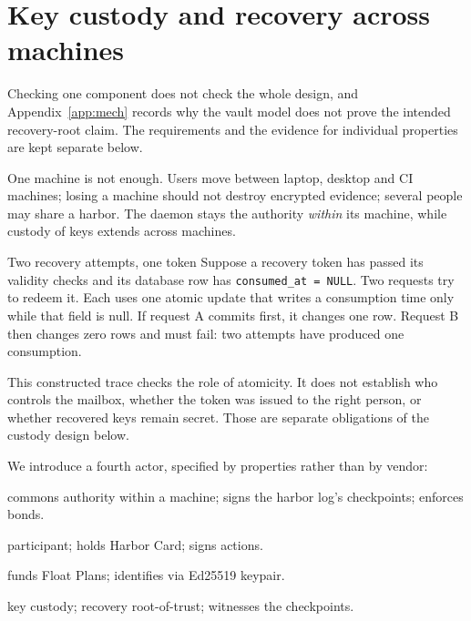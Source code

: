 \documentclass[11pt,a4paper]{article}
\theoremstyle{definition}
\theoremstyle{remark}
\begin{document}
\section{Key custody and recovery across machines}\label{sec:federated-sovereign}

Checking one component does not check the whole design, and
Appendix~\ref{app:mech} records why the vault model does not prove the
intended recovery-root claim. The requirements and the evidence for
individual properties are kept separate below.

One machine is not enough. Users move between laptop, desktop and CI machines; losing a machine should not destroy encrypted evidence; several people may share a harbor. The daemon stays the authority \emph{within} its machine, while custody of keys extends across machines.

\begin{pdexample}{Two recovery attempts, one token}
Suppose a recovery token has passed its validity checks and its database row
has \texttt{consumed\_at = NULL}. Two requests try to redeem it. Each uses
one atomic update that writes a consumption time only while that field is
null. If request A commits first, it changes one row. Request B then changes
zero rows and must fail: two attempts have produced one consumption.

This constructed trace checks the role of atomicity. It does not establish
who controls the mailbox, whether the token was issued to the right person,
or whether recovered keys remain secret. Those are separate obligations of
the custody design below.
\end{pdexample}

We introduce a fourth actor, specified by properties rather than by vendor:
\begin{description}[nosep]
  \item[Daemon] commons authority within a machine; signs the harbor log's checkpoints; enforces bonds.
  \item[Agent] participant; holds Harbor Card; signs actions.
  \item[Principal] funds Float Plans; identifies via Ed25519 keypair.
  \item[\textbf{KMS}] key custody; recovery root-of-trust; witnesses the checkpoints.
\end{description}
\end{document}
